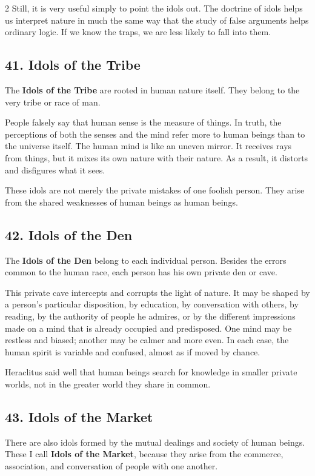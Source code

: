 \documentclass[12pt]{article}
\begin{document}
\begin{multicols}{2}
Still, it is very useful simply to point the idols out. The doctrine of idols helps us interpret nature in much the same way that the study of false arguments helps ordinary logic. If we know the traps, we are less likely to fall into them.

\subsection*{41. Idols of the Tribe}
The \textbf{Idols of the Tribe} are rooted in human nature itself. They belong to the very tribe or race of man.

People falsely say that human sense is the measure of things. In truth, the perceptions of both the senses and the mind refer more to human beings than to the universe itself. The human mind is like an uneven mirror. It receives rays from things, but it mixes its own nature with their nature. As a result, it distorts and disfigures what it sees.

These idols are not merely the private mistakes of one foolish person. They arise from the shared weaknesses of human beings as human beings.

\subsection*{42. Idols of the Den}
The \textbf{Idols of the Den} belong to each individual person. Besides the errors common to the human race, each person has his own private den or cave.

This private cave intercepts and corrupts the light of nature. It may be shaped by a person's particular disposition, by education, by conversation with others, by reading, by the authority of people he admires, or by the different impressions made on a mind that is already occupied and predisposed. One mind may be restless and biased; another may be calmer and more even. In each case, the human spirit is variable and confused, almost as if moved by chance.

Heraclitus said well that human beings search for knowledge in smaller private worlds, not in the greater world they share in common.

\subsection*{43. Idols of the Market}
There are also idols formed by the mutual dealings and society of human beings. These I call \textbf{Idols of the Market}, because they arise from the commerce, association, and conversation of people with one another.


\end{multicols}
\end{document}
